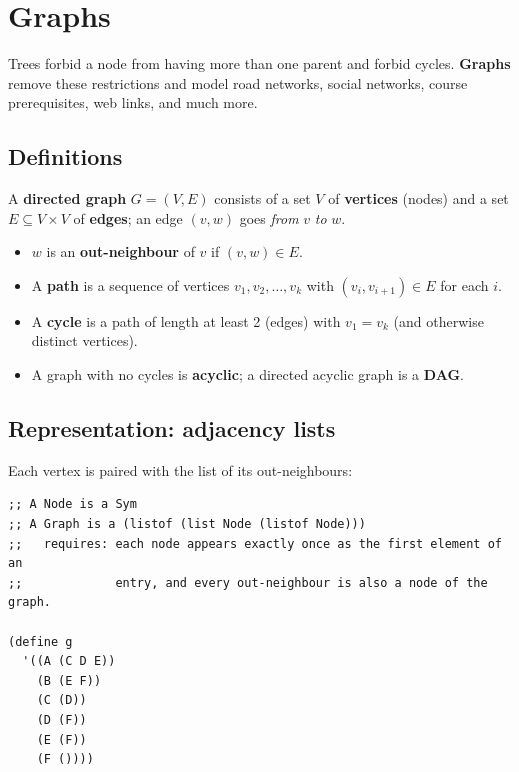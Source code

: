 \chapter{Graphs}

Trees forbid a node from having more than one parent and forbid cycles.
\textbf{Graphs} remove these restrictions and model road networks, social
networks, course prerequisites, web links, and much more.

\section{Definitions}
\begin{definition}
A \textbf{directed graph} $G = (V, E)$ consists of a set $V$ of
\textbf{vertices} (nodes) and a set $E \subseteq V \times V$ of
\textbf{edges}; an edge $(v, w)$ goes \emph{from} $v$ \emph{to} $w$.
\end{definition}
\begin{itemize}
  \item $w$ is an \textbf{out-neighbour} of $v$ if $(v, w) \in E$.
  \item A \textbf{path} is a sequence of vertices $v_1, v_2, \ldots, v_k$ with $(v_i, v_{i+1}) \in E$ for each $i$.
  \item A \textbf{cycle} is a path of length at least 2 (edges) with $v_1 = v_k$ (and otherwise distinct vertices).
  \item A graph with no cycles is \textbf{acyclic}; a directed acyclic graph is a \textbf{DAG}.
\end{itemize}

\begin{center}
\end{center}

\section{Representation: adjacency lists}
Each vertex is paired with the list of its out-neighbours:
\begin{lstlisting}[style=racket]
;; A Node is a Sym
;; A Graph is a (listof (list Node (listof Node)))
;;   requires: each node appears exactly once as the first element of an
;;             entry, and every out-neighbour is also a node of the graph.

(define g
  '((A (C D E))
    (B (E F))
    (C (D))
    (D (F))
    (E (F))
    (F ())))
\end{lstlisting}

